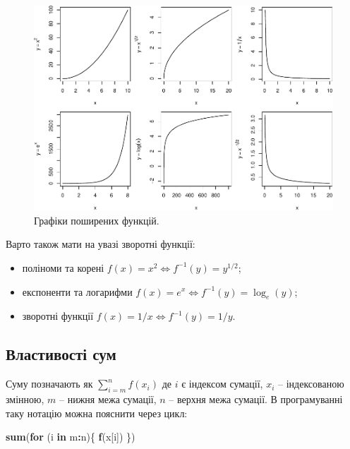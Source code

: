\documentclass[
  11pt,
]{book}
\newenvironment{Shaded}{\begin{snugshade}}{\end{snugshade}}
\newcommand{\ControlFlowTok}[1]{\textcolor[rgb]{0.13,0.29,0.53}{\textbf{#1}}}
\newcommand{\FunctionTok}[1]{\textcolor[rgb]{0.13,0.29,0.53}{\textbf{#1}}}
\newcommand{\NormalTok}[1]{#1}
\newcommand{\SpecialCharTok}[1]{\textcolor[rgb]{0.81,0.36,0.00}{\textbf{#1}}}
\providecommand{\tightlist}{%
  \setlength{\itemsep}{0pt}\setlength{\parskip}{0pt}}
\begin{document}
\begin{figure}
\centering
\includegraphics{bookdown-demo_files/figure-latex/fig-3-3-1.pdf}
\caption{\label{fig:fig-3-3}Графіки поширених функцій.}
\end{figure}

Варто також мати на увазі зворотні функції:

\begin{itemize}
\tightlist
\item
  поліноми та корені \(f(x) = x^2 \iff f^{-1}(y) = y^{1/2}\);
\item
  експоненти та логарифми \(f(x) = e^x \iff f^{-1}(y) = \log_e(y)\);
\item
  зворотні функції \(f(x) = 1/x \iff f^{-1}(y) = 1/y\).
\end{itemize}

\subsection{Властивості сум}\label{ux432ux43bux430ux441ux442ux438ux432ux43eux441ux442ux456-ux441ux443ux43c}

Суму позначають як \(\sum\limits_{i=m}^{n}f(x_i)\) де \(i\) є індексом сумації, \(x_i\) -- індексованою змінною, \(m\) -- нижня межа сумації, \(n\) -- верхня межа сумації. В програмуванні таку нотацію можна пояснити через цикл:

\begin{Shaded}
\begin{Highlighting}[]
\FunctionTok{sum}\NormalTok{(}\ControlFlowTok{for}\NormalTok{ (i }\ControlFlowTok{in}\NormalTok{ m}\SpecialCharTok{:}\NormalTok{n)\{}
  \FunctionTok{f}\NormalTok{(x[i])}
\NormalTok{\})}
\end{Highlighting}
\end{Shaded}
\end{document}
